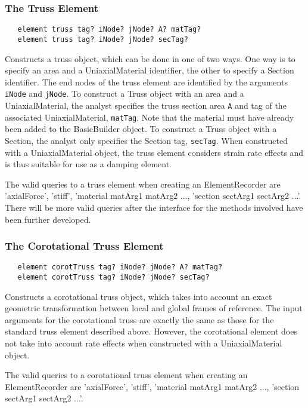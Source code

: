 \documentclass[12pt]{article}
\begin{document}
\subsubsection{The Truss Element}
{\sf\small
\begin{verbatim}
   element truss tag? iNode? jNode? A? matTag?
   element truss tag? iNode? jNode? secTag?
\end{verbatim}
}

\noindent Constructs a truss object, which can be done in one of two ways.
One way is
to specify an area and a UniaxialMaterial identifier, the other to specify a
Section identifier. The end nodes of the truss element are identified
by the arguments {\tt iNode} and {\tt jNode}.
To construct a Truss object with an area and a
UniaxialMaterial, the analyst specifies the truss section area {\tt A} and 
tag of the associated UniaxialMaterial, {\tt matTag}.
Note that the material must have already
been added to the BasicBuilder object. To construct a Truss object
with a Section, the analyst only specifies the Section tag, {\tt secTag}.
When constructed with a UniaxialMaterial object,
the truss element considers strain rate effects and is thus suitable for
use as a damping element.

The valid queries to a truss element when creating an ElementRecorder
are 'axialForce', 'stiff', 'material matArg1 matArg2 ..., 'section sectArg1
sectArg2 ...'. There will be more valid queries after the interface
for the methods involved have been further developed.

\subsubsection{The Corotational Truss Element}
{\sf\small
\begin{verbatim}
   element corotTruss tag? iNode? jNode? A? matTag?
   element corotTruss tag? iNode? jNode? secTag?
\end{verbatim}
}

\noindent Constructs a corotational truss object, which takes into account
an exact geometric transformation between local and global frames of reference.
The input arguments for the corotational truss are exactly the same as
those for the standard truss element described above. However, the
corotational element does not take into account rate effects when
constructed with a UniaxialMaterial object.

The valid queries to a corotational truss element when creating an
ElementRecorder are 'axialForce', 'stiff', 'material matArg1 matArg2 ...,
'section sectArg1 sectArg2 ...'.
\end{document}
